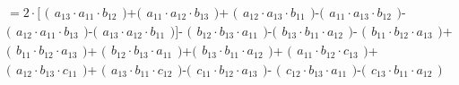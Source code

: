 \documentclass[11pt]{article}
\begin{document}
    \(= 2 \cdot \bigl[\)
\(\bigl(\begin{matrix}a_{13} \cdot a_{11} \cdot b_{12}\end{matrix}\bigr)\)+\(\bigl(\begin{matrix}a_{11} \cdot a_{12} \cdot b_{13}\end{matrix}\bigr)\)+
\(\bigl(\begin{matrix}a_{12} \cdot a_{13} \cdot b_{11}\end{matrix}\bigr)\)-\(\bigl(\begin{matrix}a_{11} \cdot a_{13} \cdot b_{12}\end{matrix}\bigr)\)-
\(\bigl(\begin{matrix}a_{12} \cdot a_{11} \cdot b_{13}\end{matrix}\bigr)\)-\(\bigl(\begin{matrix}a_{13} \cdot a_{12} \cdot b_{11}\end{matrix}\bigr)\bigl]\)-
\(\bigl(\begin{matrix}b_{12} \cdot b_{13} \cdot a_{11}\end{matrix}\bigr)\)-\(\bigl(\begin{matrix}b_{13} \cdot b_{11} \cdot a_{12}\end{matrix}\bigr)\)-
\(\bigl(\begin{matrix}b_{11} \cdot b_{12} \cdot a_{13}\end{matrix}\bigr)\)+\(\bigl(\begin{matrix}b_{11} \cdot b_{12} \cdot a_{13}\end{matrix}\bigr)\)+
\(\bigl(\begin{matrix}b_{12} \cdot b_{13} \cdot a_{11}\end{matrix}\bigr)\)+\(\bigl(\begin{matrix}b_{13} \cdot b_{11} \cdot a_{12}\end{matrix}\bigr)\)+
\(\bigl(\begin{matrix}a_{11} \cdot b_{12} \cdot c_{13}\end{matrix}\bigr)\)+\(\bigl(\begin{matrix}a_{12} \cdot b_{13} \cdot c_{11}\end{matrix}\bigr)\)+
\(\bigl(\begin{matrix}a_{13} \cdot b_{11} \cdot c_{12}\end{matrix}\bigr)\)-\(\bigl(\begin{matrix}c_{11} \cdot b_{12} \cdot a_{13}\end{matrix}\bigr)\)-
\(\bigl(\begin{matrix}c_{12} \cdot b_{13} \cdot a_{11}\end{matrix}\bigr)\)-\(\bigl(\begin{matrix}c_{13} \cdot b_{11} \cdot a_{12}\end{matrix}\bigr)\)
\end{document}
